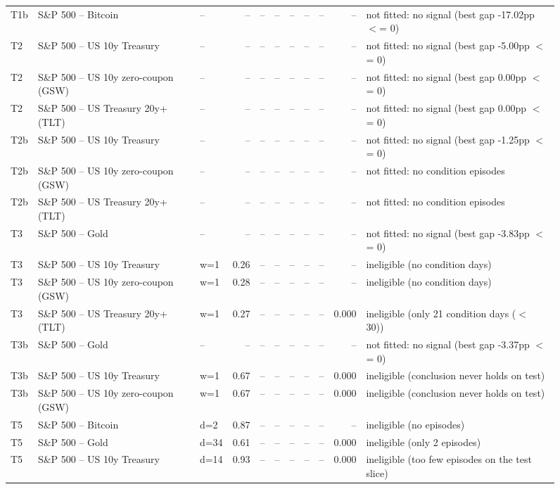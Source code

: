 \begin{figure}
\begin{tabular}{lllrrrrrrrl}
T1b & S\&P 500 -- Bitcoin & -- & -- & -- & -- & -- & -- & -- & -- & not fitted: no signal (best gap -17.02pp $<$= 0) \\
T2 & S\&P 500 -- US 10y Treasury & -- & -- & -- & -- & -- & -- & -- & -- & not fitted: no signal (best gap -5.00pp $<$= 0) \\
T2 & S\&P 500 -- US 10y zero-coupon (GSW) & -- & -- & -- & -- & -- & -- & -- & -- & not fitted: no signal (best gap 0.00pp $<$= 0) \\
T2 & S\&P 500 -- US Treasury 20y+ (TLT) & -- & -- & -- & -- & -- & -- & -- & -- & not fitted: no signal (best gap 0.00pp $<$= 0) \\
T2b & S\&P 500 -- US 10y Treasury & -- & -- & -- & -- & -- & -- & -- & -- & not fitted: no signal (best gap -1.25pp $<$= 0) \\
T2b & S\&P 500 -- US 10y zero-coupon (GSW) & -- & -- & -- & -- & -- & -- & -- & -- & not fitted: no condition episodes \\
T2b & S\&P 500 -- US Treasury 20y+ (TLT) & -- & -- & -- & -- & -- & -- & -- & -- & not fitted: no condition episodes \\
T3 & S\&P 500 -- Gold & -- & -- & -- & -- & -- & -- & -- & -- & not fitted: no signal (best gap -3.83pp $<$= 0) \\
T3 & S\&P 500 -- US 10y Treasury & w=1 & 0.26 & -- & -- & -- & -- & -- & -- & ineligible (no condition days) \\
T3 & S\&P 500 -- US 10y zero-coupon (GSW) & w=1 & 0.28 & -- & -- & -- & -- & -- & -- & ineligible (no condition days) \\
T3 & S\&P 500 -- US Treasury 20y+ (TLT) & w=1 & 0.27 & -- & -- & -- & -- & -- & 0.000 & ineligible (only 21 condition days ($<$ 30)) \\
T3b & S\&P 500 -- Gold & -- & -- & -- & -- & -- & -- & -- & -- & not fitted: no signal (best gap -3.37pp $<$= 0) \\
T3b & S\&P 500 -- US 10y Treasury & w=1 & 0.67 & -- & -- & -- & -- & -- & 0.000 & ineligible (conclusion never holds on test) \\
T3b & S\&P 500 -- US 10y zero-coupon (GSW) & w=1 & 0.67 & -- & -- & -- & -- & -- & 0.000 & ineligible (conclusion never holds on test) \\
T5 & S\&P 500 -- Bitcoin & d=2 & 0.87 & -- & -- & -- & -- & -- & -- & ineligible (no episodes) \\
T5 & S\&P 500 -- Gold & d=34 & 0.61 & -- & -- & -- & -- & -- & 0.000 & ineligible (only 2 episodes) \\
T5 & S\&P 500 -- US 10y Treasury & d=14 & 0.93 & -- & -- & -- & -- & -- & 0.000 & ineligible (too few episodes on the test slice) \\

\end{tabular}
\end{figure}
